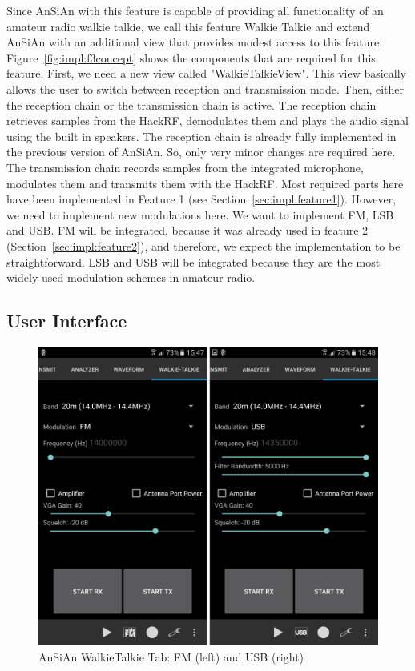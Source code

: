Since AnSiAn with this feature is capable of providing all functionality of an amateur radio walkie talkie, we call this feature Walkie Talkie and extend AnSiAn with an additional view that provides modest access to this feature. Figure~\ref{fig:impl:f3concept} shows the components that are required for this feature. First, we need a new view called "WalkieTalkieView". This view basically allows the user to switch between reception and transmission mode. Then, either the reception chain or the transmission chain is active. The reception chain retrieves samples from the HackRF, demodulates them and plays the audio signal using the built in speakers. The reception chain is already fully implemented in the previous version of AnSiAn. So, only very minor changes are required here. 
The transmission chain records samples from the integrated microphone, modulates them and transmits them with the HackRF. Most required parts here have been implemented in Feature 1 (see Section~\ref{sec:impl:feature1}). However, we need to implement new modulations here. We want to implement FM, LSB and USB. FM will be integrated, because it was already used in feature 2 (Section~\ref{sec:impl:feature2}), and therefore, we expect the implementation to be straightforward. LSB and USB will be integrated because they are the most widely used modulation schemes in amateur radio. 

\subsection{User Interface}
\begin{figure}
	\includegraphics[width=1.0\linewidth]{gfx/screenshot_walkietalkie.png}
	\caption{AnSiAn WalkieTalkie Tab: FM (left) and USB (right)}
	\label{fig:impl:f3ui}
\end{figure}

